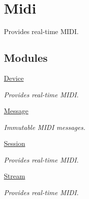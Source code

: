 \hypertarget{group___fa_midi}{\section{Midi}
\label{group___fa_midi}
}


Provides real-\/time M\-I\-D\-I.  


\subsection*{Modules}
\begin{DoxyCompactItemize}
\item 
\hyperlink{group___fa_midi_device}{Device}
\begin{DoxyCompactList}\small\item\em Provides real-\/time M\-I\-D\-I. \end{DoxyCompactList}\item 
\hyperlink{group___fa_midi_message}{Message}
\begin{DoxyCompactList}\small\item\em Immutable M\-I\-D\-I messages. \end{DoxyCompactList}\item 
\hyperlink{group___fa_midi_session}{Session}
\begin{DoxyCompactList}\small\item\em Provides real-\/time M\-I\-D\-I. \end{DoxyCompactList}\item 
\hyperlink{group___fa_midi_stream}{Stream}
\begin{DoxyCompactList}\small\item\em Provides real-\/time M\-I\-D\-I. \end{DoxyCompactList}\end{DoxyCompactItemize}
